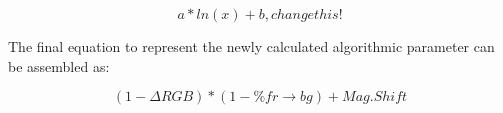 \documentclass[12pt]{report}
\begin{document}
\begin{equation}
a*ln(x) + b, {change this!}
\end{equation}

The final equation to represent the newly calculated algorithmic parameter can be assembled as:

\begin{equation}
(1 - \Delta RGB)*(1 - \%fr \rightarrow bg) + Mag. Shift
\end{equation}
\end{document}
